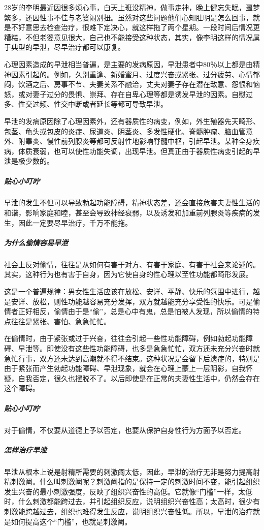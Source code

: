 28岁的李明最近因很多烦心事，白天上班没精神，做事走神，晚上健忘失眠，噩梦繁多，还因性事不佳与老婆闹别扭。虽然对这些问题他们心知肚明是怎么回事，就是不好意思去检查治疗，很难下定决心，就这样拖了两个星期。一段时间后情况更糟糕，不但老婆意见很大，自己也不能接受这种状态，其实，像李明这样的情况属于典型的早泄，尽早治疗都可以康复。

心理因素造成的早泄相当普遍，是主要的发病原因，早泄患者中80％以上都是由精神因素引起的。例如，久别重逢、新婚蜜月、过度兴奋或紧张、过分疲劳、心情郁闷，饮酒之后、房事不节、夫妻关系不融洽，丈夫对妻子存在潜在敌意、怨恨和恼怒，或对妻子过分的畏惧、崇拜、存在自卑心理等都是诱发早泄的因素。自慰过多、性交过频、性交中断或者延长等都可导致早泄。

早泄的发病原因除了心理因素外，还有器质性的病变，例如，外生殖器先天畸形、包茎、龟头或包皮的炎症、尿道炎、阴茎炎、多发性硬化、脊髓肿瘤、脑血管意外、附睾炎、慢性前列腺炎等都可反射性地影响脊髓中枢，引起早泄。某种全身疾病，体质衰弱，也可以使性功能失调，出现早泄。但真正由于器质性病变引起的早泄是极少数的。

\subparagraph{贴心小叮咛}

早泄的发生不但可以导致勃起功能障碍，精神状态差，还会直接危害夫妻性生活的和谐，影响家庭和睦，甚至会导致神经衰弱，以及诱发和加重前列腺炎等疾病的发生，因此一定要尽早治疗，千万不能拖。

\subparagraph{为什么偷情容易早泄}

社会上反对偷情，往往是从如何有害于对方、有害于家庭、有害于社会来论述的。其实，这种行为也有害于自身，因为它使自身的性心理以至性功能都畸形发展。

这是一个普遍规律：男女性生活应该在放松、安详、平静、快乐的氛围中进行，越是安详、放松，则性功能越容易充分发挥，双方就越能充分享受性的快乐。可是偷情者正好相反，偷情由于是“偷”，总是心中有鬼，总是怕被人发现，所以偷情的特点往往是紧张、害怕、急急忙忙。

在偷情时，由于紧张或过于兴奋，往往会引起一些性功能障碍，例如勃起功能障碍、早泄等。即使没有这些性功能障碍，也多是急急忙忙，双方还未充分兴奋时就急忙行事，双方还未达到高潮就不得不结束。这种状况是会留下后遗症的，特别是由于紧张而产生勃起功能障碍、早泄现象，就会在心理上蒙上一层阴影，自我怀疑，自我否定，很久也摆脱不了。以后即使是在正常的夫妻性生活中，仍然会存在这个障碍。

\subparagraph{贴心小叮咛}

对于偷情，不仅要从道德上予以否定，也要从保护自身性行为方面予以否定。

\subparagraph{怎样治疗早泄}

早泄从根本上说是射精所需要的刺激阈太低，因此，早泄的治疗无非是努力提高射精刺激阈。什么叫刺激阈呢？刺激阈指的是保持一定的刺激时间不变，能引起组织发生兴奋的最小刺激强度，反映了组织兴奋性的高低。它就像“门槛”一样，太低时，什么刺激都能跨过去，并引起组织反应，说明组织兴奋性高；太高时，很少有刺激能跨越过去，组织也难得发生反应，说明组织兴奋性低。所以，早泄的治疗就是如何提高这个“门槛”，也就是刺激阈。

